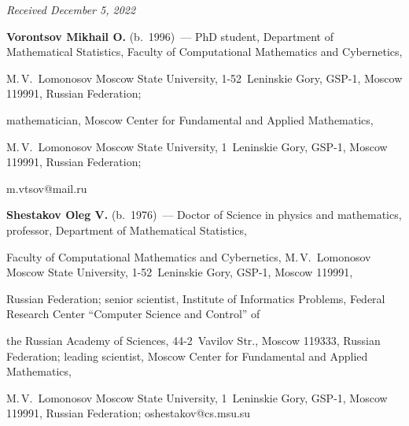 \vspace*{-6pt}



\hfill{\small\textit{Received December 5, 2022}} 

\Contr



\noindent

\textbf{Vorontsov Mikhail O.} (b.\ 1996)~--- PhD student, Department of Mathematical Statistics, Faculty of Computational Mathematics and Cybernetics, 

M.\,V.~Lomonosov Moscow State University, 1-52~Leninskie Gory, GSP-1, Moscow 119991, Russian Federation;

mathematician,  Moscow Center for Fundamental and Applied Mathematics, 

M.\,V.~Lomonosov Moscow State University, 1~Leninskie Gory, GSP-1, Moscow 119991, Russian Federation;

\mbox{m.vtsov@mail.ru}



\vspace*{5pt}



\noindent

\textbf{Shestakov Oleg V.} (b.\ 1976)~--- Doctor of Science in physics and mathematics, professor, Department of Mathematical Statistics, 

Faculty of Computational Mathematics and Cybernetics, M.\,V.~Lomonosov Moscow State University, 1-52~Leninskie Gory, GSP-1, Moscow 119991, 

Russian Federation; senior scientist, Institute of Informatics Problems, Federal Research Center ``Computer Science and Control'' of 

the Russian Academy of Sciences, 44-2~Vavilov Str., Moscow 119333, Russian Federation; leading scientist, Moscow Center for Fundamental and Applied Mathematics, 

M.\,V.~Lomonosov Moscow State University, 1~Leninskie Gory, GSP-1, Moscow 119991, Russian Federation; \mbox{oshestakov@cs.msu.su}

\label{end\stat}



\renewcommand{\bibname}{\protect\rm Литература} 

